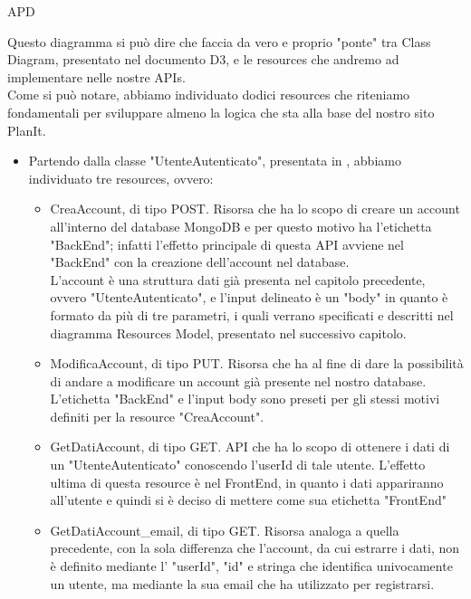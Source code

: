 \begin{listaPersonale} {APD}
    \begin{listaPersonale2}[APD]{}
        Questo diagramma si può dire che faccia da vero e proprio "ponte" tra Class Diagram, presentato nel documento D3, e le resources che andremo ad implementare nelle nostre APIs. \\
        Come si può notare, abbiamo individuato dodici resources che riteniamo fondamentali per sviluppare almeno la logica che sta alla base del nostro sito PlanIt. \\
        \begin{itemize}
            \item Partendo dalla classe "UtenteAutenticato", presentata in , abbiamo individuato tre resources, ovvero:
                  \begin{itemize}
                      \item CreaAccount, di tipo POST. Risorsa che ha lo scopo di creare un account all'interno del database MongoDB e per questo motivo ha l'etichetta "BackEnd"; infatti l'effetto principale di questa API avviene nel "BackEnd" con la creazione dell'account nel database.\\ L'account è una struttura dati già presenta nel capitolo precedente, ovvero "UtenteAutenticato", e l'input delineato è un "body" in quanto è formato da più di tre parametri, i quali verrano specificati e descritti nel diagramma Resources Model, presentato nel successivo capitolo.
                      \item ModificaAccount, di tipo PUT. Risorsa che ha al fine di dare la possibilità di andare a modificare un account già presente nel nostro database. L'etichetta "BackEnd" e l'input body sono preseti per gli stessi motivi definiti per la resource "CreaAccount".
                      \item GetDatiAccount, di tipo GET. API che ha lo scopo di ottenere i dati di un "UtenteAutenticato" conoscendo l'userId di tale utente. L'effetto ultima di questa resource è nel FrontEnd, in quanto i dati appariranno all'utente e quindi si è deciso di mettere come sua etichetta "FrontEnd"
                      \item GetDatiAccount\_email, di tipo GET. Risorsa analoga a quella precedente, con la sola differenza che l'account, da cui estrarre i dati, non è definito mediante l' "userId", "id" e stringa che identifica univocamente un utente, ma mediante la sua email che ha utilizzato per registrarsi.

\end{itemize}
\end{itemize}
\end{listaPersonale2}
\end{listaPersonale}
